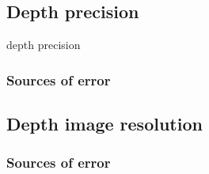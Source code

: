 \subsection{Depth precision}
depth precision

\subsubsection{Sources of error}

\subsection{Depth image resolution}

\subsubsection{Sources of error}
